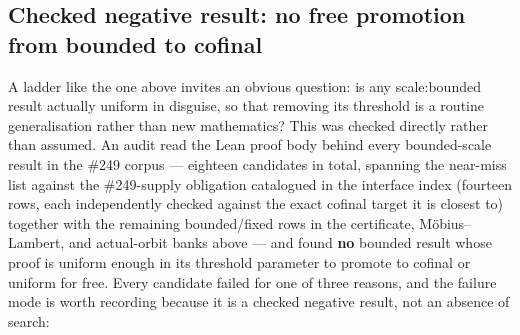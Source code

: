 \documentclass[11pt]{article}
\theoremstyle{plain}
\theoremstyle{definition}
\theoremstyle{remark}
\newcommand{\scale}[1]{{\small\textsf{scale:#1}}\xspace}
\begin{document}
\subsection{Checked negative result: no free promotion from bounded to cofinal}

A ladder like the one above invites an obvious question: is any \scale{bounded} result actually
uniform in disguise, so that removing its threshold is a routine generalisation rather than new
mathematics? This was checked directly rather than assumed. An audit read the Lean proof body
behind every bounded-scale result in the \#249 corpus — eighteen candidates in total, spanning
the near-miss list against the \#249-supply obligation catalogued in the interface index (fourteen
rows, each independently checked against the exact cofinal target it is closest to) together with
the remaining bounded/fixed rows in the certificate, M\"obius--Lambert, and actual-orbit banks
above — and found \textbf{no} bounded result whose proof is uniform enough in its threshold
parameter to promote to cofinal or uniform for free. Every candidate failed for one of three
reasons, and the failure mode is worth recording because it is a checked negative result, not an
absence of search:
\end{document}
